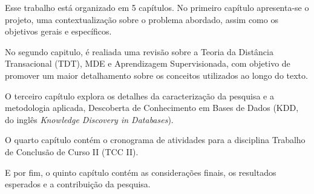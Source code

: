 Esse trabalho está organizado em 5 capítulos. No primeiro capítulo apresenta-se
o projeto, uma contextualização sobre o problema abordado, assim como os
objetivos gerais e específicos.

No segundo capitulo, é realiada uma revisão sobre a Teoria da Distância
Transacional (TDT), MDE e Aprendizagem Supervisionada, com objetivo de promover
um maior detalhamento sobre os conceitos utilizados ao longo do texto.

O terceiro capítulo explora os detalhes da caracterização da pesquisa e a
metodologia aplicada, Descoberta de Conhecimento em Bases de Dados (KDD, do
inglês \textit{Knowledge Discovery in Databases}).

O quarto capítulo contém o cronograma de atividades para a disciplina Trabalho
de Conclusão de Curso II (TCC II).

E por fim, o quinto capítulo contém as considerações finais, os resultados
esperados e a contribuição da pesquisa.
